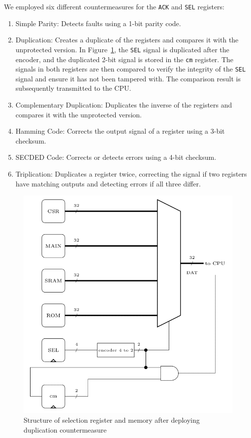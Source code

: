 We employed six different countermeasures for the \texttt{ACK} and \texttt{SEL} registers:
\begin{enumerate}
\item Simple Parity: Detects faults using a 1-bit parity code.
\item Duplication: Creates a duplicate of the registers and compares it with the unprotected version. In Figure~\ref{cm archi}, the \texttt{SEL} signal is duplicated after the encoder, and the duplicated 2-bit signal is stored in the \texttt{cm} register. The signals in both registers are then compared to verify the integrity of the \texttt{SEL} signal and ensure it has not been tampered with. The comparison result is subsequently transmitted to the CPU.
\item Complementary Duplication: Duplicates the inverse of the registers and compares it with the unprotected version.
\item Hamming Code: Corrects the output signal of a register using a 3-bit checksum.
\item SECDED Code: Corrects or detects errors using a 4-bit checksum.
\item Triplication: Duplicates a register twice, correcting the signal if two registers have matching outputs and detecting errors if all three differ.
\end{enumerate}

\begin{figure}[t!]
  \centering
  \includegraphics[width=0.9\linewidth]{Chapitre4/figures/cm.png}
  \caption{Structure of selection register and memory after deploying duplication countermeasure}
  \label{cm archi}
\end{figure}

